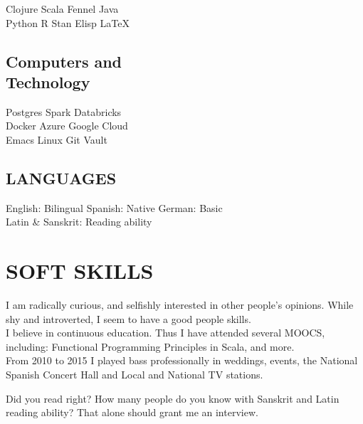 \documentclass[]{deedy-resume-openfont}
\begin{document}
\begin{minipage}[t]{0.33\textwidth}
Clojure \textbullet{} Scala \textbullet{} Fennel \textbullet{} Java \\ 
Python \textbullet{} R \textbullet{} Stan \textbullet{} Elisp \textbullet{} \LaTeX\ \\

\sectionsep

\subsection{Computers and \\  Technology}

Postgres \textbullet{} Spark \textbullet{} Databricks \\
Docker \textbullet{} Azure  \textbullet{} Google Cloud  \\
Emacs \textbullet{} Linux \textbullet{} Git \textbullet{} Vault \\

\sectionsep

\subsection{LANGUAGES}

English: Bilingual \textbullet{} Spanish: Native \textbullet{} 
German: Basic \textbullet{} \\
Latin \& Sanskrit: Reading ability \\
\sectionsep

\section{SOFT SKILLS} 
I am radically curious, and selfishly interested in other people's opinions.
While shy and introverted, I seem to have a good people skills.\\

\sectionsep
I believe in continuous education. Thus I have attended several MOOCS, including:
Functional Programming Principles in Scala, and more.\\

\sectionsep
From 2010 to 2015 I played bass professionally in weddings, events, the National Spanish Concert Hall and Local and National TV stations. \\
\sectionsep

\sectionsep
Did you read right? How many people do you know with Sanskrit and Latin reading ability?
That alone should grant me an interview.
\sectionsep

%
%

\end{minipage} 
\end{document}
